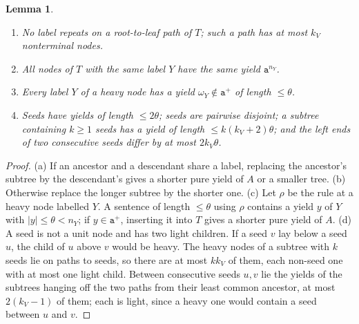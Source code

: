 \documentclass[11pt]{article}
\numberwithin{equation}{section}
\theoremstyle{plain}
\newtheorem{lemma}[theorem]{Lemma}
\theoremstyle{definition}
\theoremstyle{remark}
\theoremstyle{plain}
\begin{document}
\begin{lemma}
\label{lem:app-h-tree}
\begin{enumerate}[label=\textup{(\alph*)},leftmargin=*]
\item No label repeats on a root-to-leaf path of $T$; such a path has at
most $k_V$ nonterminal nodes.
\item All nodes of $T$ with the same label $Y$ have the same yield
$\mathtt a^{n_Y}$.
\item Every label $Y$ of a heavy node has a yield $\omega_Y\notin\mathtt a^+$ of
length $\le\theta$.
\item Seeds have yields of length $\le2\theta$; seeds are pairwise disjoint;
a subtree containing $k\ge1$ seeds has a yield of length $\le k(k_V+2)\theta$; and
the left ends of two consecutive seeds differ by at most $2k_V\theta$.
\end{enumerate}
\end{lemma}

\begin{proof}
(a) If an ancestor and a descendant share a label, replacing the ancestor's
subtree by the descendant's gives a shorter pure yield of $A$ or a smaller
tree.  (b) Otherwise replace the longer subtree by the shorter one.  (c) Let
$\rho$ be the rule at a heavy node labelled $Y$.  A sentence of length
$\le\theta$ using $\rho$ contains a yield $y$ of $Y$ with $|y|\le\theta<n_Y$;
if $y\in\mathtt a^+$, inserting it into $T$ gives a shorter pure yield of $A$.
(d) A seed is not a unit node and has two light children.  If a seed $v$ lay
below a seed $u$, the child of $u$ above $v$ would be heavy.  The heavy nodes of
a subtree with $k$ seeds lie on paths to seeds, so there are at most $kk_V$ of
them, each non-seed one with at most one light child.  Between consecutive
seeds $u,v$ lie the yields of the subtrees hanging off the two paths from
their least common ancestor, at most $2(k_V-1)$ of them; each is light, since a
heavy one would contain a seed between $u$ and $v$.
\end{proof}
\end{document}

